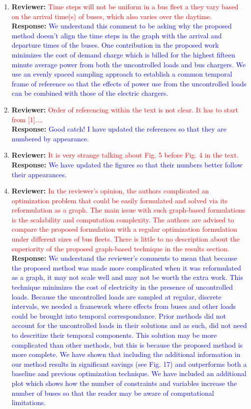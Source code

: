 \documentclass{article}
\newcommand\formatfeedback[2]
{%
	\textbf{Reviewer:} \textcolor{red}{#1} 
	\leavevmode\\[0.1in] \textbf{Response:} \textcolor{blue}{#2}
}
\begin{document}
\begin{enumerate}
	\item \formatfeedback{Time steps will not be uniform in a bus fleet a they vary based on the arrival time(s) of buses, which also varies over the daytime.}{ We understand this comment to be asking why the proposed method doesn't align the time steps in the graph with the arrival and departure times of the buses. One contribution in the proposed work minimizes the cost of demand charge which is billed for the highest fifteen minute average power from both the uncontrolled loads and bus chargers. We use an evenly spaced sampling approach to establish a common temporal frame of reference so that the effects of power use from the uncontrolled loads can be combined with those of the electric chargers.} 
	\item \formatfeedback{Order of referencing within the text is not clear. It has to start from [1]....}{Good catch! I have updated the references so that they are numbered by appearance.}
	\item \formatfeedback{It is very strange talking about Fig. 5 before Fig. 4 in the text.}{We have updated the figures so that their numbers better follow their appearances.}
	\item \formatfeedback{In the reviewer's opinion, the authors complicated an optimization problem that could be easily formulated and solved via its reformulation as a graph. The main issue with such graph-based formulations is the scalability and computation complexity. The authors are advised to compare the proposed formulation with a regular optimization formulation under different sizes of bus fleets. There is little to no description about the superiority of the proposed graph-based technique in the results section.}{We understand the reviewer's comments to mean that because the proposed method was made more complicated when it was reformulated as a graph, it may not scale well and may not be worth the extra work. This technique minimizes the cost of electricity in the presence of uncontrolled loads. Because the uncontrolled loads are sampled at regular, discrete intervals, we needed a framework where effects from buses and other loads could be brought into temporal correspondance. Prior methods did not account for the uncontrolled loads in their solutions and as such, did not need to descritize their temporal components. This solution may be more complicated than other methods, but this is because the proposed method is more complete. We have shown that including the additional information in our method results in significant savings (see Fig. 17) and outperforms both a baseline and previous optimization technique. We have included an additional plot which shows how the number of constraints and variables increase the number of buses so that the reader may be aware of computational limitations. 
 }
\end{enumerate}
\end{document}
